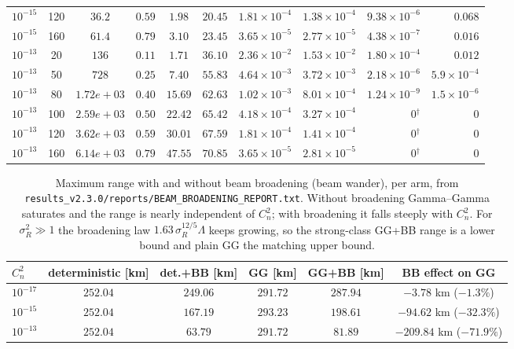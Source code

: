 \begin{table}[htbp]
\begin{tabular}{lcccccccrr}
$10^{-15}$ & 120 & $36.2$ & $0.59$ & $1.98$ & $20.45$ & $1.81\times10^{-4}$ & $1.38\times10^{-4}$ & $9.38\times10^{-6}$ & $0.068$ \\
$10^{-15}$ & 160 & $61.4$ & $0.79$ & $3.10$ & $23.45$ & $3.65\times10^{-5}$ & $2.77\times10^{-5}$ & $4.38\times10^{-7}$ & $0.016$ \\
\midrule
$10^{-13}$ & 20 & $136$ & $0.11$ & $1.71$ & $36.10$ & $2.36\times10^{-2}$ & $1.53\times10^{-2}$ & $1.80\times10^{-4}$ & $0.012$ \\
$10^{-13}$ & 50 & $728$ & $0.25$ & $7.40$ & $55.83$ & $4.64\times10^{-3}$ & $3.72\times10^{-3}$ & $2.18\times10^{-6}$ & $5.9\times10^{-4}$ \\
$10^{-13}$ & 80 & $1.72e+03$ & $0.40$ & $15.69$ & $62.63$ & $1.02\times10^{-3}$ & $8.01\times10^{-4}$ & $1.24\times10^{-9}$ & $1.5\times10^{-6}$ \\
$10^{-13}$ & 100 & $2.59e+03$ & $0.50$ & $22.42$ & $65.42$ & $4.18\times10^{-4}$ & $3.27\times10^{-4}$ & $0$$^{\dagger}$ & $0$ \\
$10^{-13}$ & 120 & $3.62e+03$ & $0.59$ & $30.01$ & $67.59$ & $1.81\times10^{-4}$ & $1.41\times10^{-4}$ & $0$$^{\dagger}$ & $0$ \\
$10^{-13}$ & 160 & $6.14e+03$ & $0.79$ & $47.55$ & $70.85$ & $3.65\times10^{-5}$ & $2.81\times10^{-5}$ & $0$$^{\dagger}$ & $0$ \\

\bottomrule
\end{tabular}
\end{table}

\begin{table}[htbp]
\centering\small
\caption{Maximum range with and without beam broadening (beam wander), per arm, from \texttt{results\_v2.3.0/reports/BEAM\_BROADENING\_REPORT.txt}. Without broadening Gamma--Gamma saturates and the range is nearly independent of $C_n^2$; with broadening it falls steeply with $C_n^2$. For $\sigma_R^2\gg1$ the broadening law $1.63\,\sigma_R^{12/5}\Lambda$ keeps growing, so the strong-class GG+BB range is a lower bound and plain GG the matching upper bound.}
\label{tab:bw-range}
\begin{tabular}{lccccc}
\toprule
$C_n^2$ & deterministic [km] & det.+BB [km] & GG [km] & GG+BB [km] & BB effect on GG \\
\midrule
$10^{-17}$ & $252.04$ & $249.06$ & $291.72$ & $287.94$ & $-3.78$ km ($-1.3\%$) \\
$10^{-15}$ & $252.04$ & $167.19$ & $293.23$ & $198.61$ & $-94.62$ km ($-32.3\%$) \\
$10^{-13}$ & $252.04$ & $63.79$ & $291.72$ & $81.89$ & $-209.84$ km ($-71.9\%$) \\
\bottomrule
\end{tabular}
\end{table}
